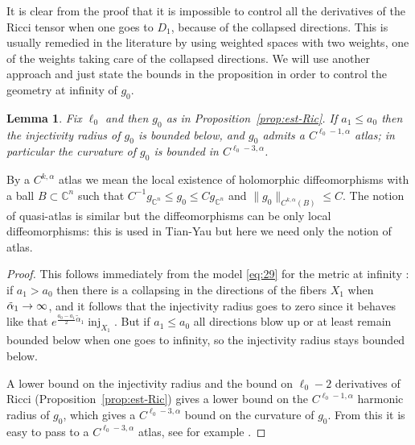 \documentclass[JEP,XML,SOM,Unicode, NoEqCountersInSection, NoFloatCountersInSection]{cedram}
\theoremstyle{plain}
\newtheorem{lem}[thm]{Lemma}
\theoremstyle{definition}
\DeclareMathOperator{\inj}{inj}
\newcommand{\ta}{\tilde \alpha}
\begin{document}
It is clear from the proof that it is impossible to control all the derivatives of the Ricci tensor when one goes to $D_1$, because of the collapsed directions. This is usually remedied in the literature by using weighted spaces with two weights, one of the weights taking care of the collapsed directions. We will use another approach and just state the bounds in the proposition in order to control the geometry at infinity of $g_0$.


\begin{lem}\label{lem:atlas}
Fix $\ell_0$ and then $g_0$ as in Proposition~\ref{prop:est-Ric}. If $a_1\leq a_0$ then the injectivity radius of $g_0$ is bounded below, and $g_0$ admits a $C^{\ell_0-1,\alpha}$ atlas; in particular the curvature of $g_0$ is bounded in $C^{\ell_0-3,\alpha}$.
\end{lem}
By a $C^{k,\alpha}$ atlas we mean the local existence of holomorphic diffeomorphisms with a ball $B\subset \mathbb{C}^n$ such that $C^{-1}g_{\mathbb{C}^n} \leq g_0 \leq C g_{\mathbb{C}^n}$ and $\|g_0\|_{C^{k,\alpha}(B)} \leq C$. The notion of quasi-atlas is similar but the diffeomorphisms can be only local diffeomorphisms: this is used in Tian-Yau \cite{TiaYau90} but here we need only the notion of atlas.
\begin{proof}
This follows immediately from the model \eqref{eq:29} for the metric at infinity : if $a_1>a_0$ then there is a collapsing in the directions of the fibers $X_1$ when $\ta_1\to\nobreak\infty$, and it follows that the injectivity radius goes to zero since it behaves like that $e^{\frac{a_0-a_1}2\ta_1}\inj_{X_1}$. But if $a_1\leq a_0$ all directions blow up or at least remain bounded below when one goes to infinity, so the injectivity radius stays bounded below.

A lower bound on the injectivity radius and the bound on $\ell_0-2$ derivatives of Ricci (Proposition~\ref{prop:est-Ric}) gives a lower bound on the $C^{\ell_0-1,\alpha}$ harmonic radius of $g_0$, which gives a $C^{\ell_0-3,\alpha}$ bound on the curvature of $g_0$. From this it is easy to pass to a $C^{\ell_0-3,\alpha}$ atlas, see for example \cite{TiaYau90}.
\end{proof}
\end{document}
